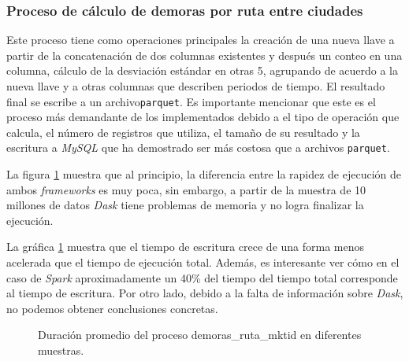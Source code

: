 \subsubsection{Proceso de cálculo de demoras por ruta entre ciudades}

Este proceso tiene como operaciones principales la creación de una nueva llave a partir de la concatenación de dos columnas existentes y después un conteo en una columna, cálculo de la desviación estándar en otras 5, agrupando de acuerdo a la nueva llave y a otras columnas que describen periodos de tiempo. El resultado final se escribe a un archivo\texttt{parquet}. Es importante mencionar que este es el proceso más demandante de los implementados debido a el tipo de operación que calcula, el número de registros que utiliza, el tamaño de su resultado y la escritura a \textit{MySQL} que ha demostrado ser más costosa que a archivos \texttt{parquet}.

La figura \ref{lineas:local-demoras-ruta-mktid} muestra que al principio, la diferencia entre la rapidez de ejecución de ambos \textit{frameworks} es muy poca, sin embargo, a partir de la muestra de 10 millones de datos \textit{Dask} tiene problemas de memoria y no logra finalizar la ejecución.

La gráfica \ref{lineas:local-demoras-ruta-mktid} muestra que el tiempo de escritura crece de una forma menos acelerada que el tiempo de ejecución total. Además, es interesante ver cómo en el caso de \textit{Spark} aproximadamente un 40\% del tiempo del tiempo total corresponde al tiempo de escritura. Por otro lado, debido a la falta de información sobre \textit{Dask}, no podemos obtener conclusiones concretas. 

\begin{figure}
\centering
{}
\caption{Duración promedio del proceso demoras\_ruta\_mktid en diferentes muestras.}
\label{lineas:local-demoras-ruta-mktid}
\end{figure}


